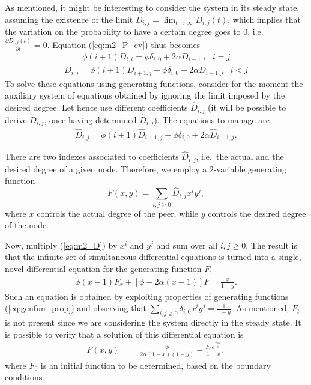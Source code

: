 \documentclass[a4paper,twosided]{article}
\begin{document}
As mentioned, it might be interesting to consider the system in its steady state, assuming the existence of the limit $D_{i,j} = \lim_{t \rightarrow \infty} D_{i,j}(t)$, which implies that the variation on the probability to have a certain degree goes to $0$, i.e.~$\frac{\partial D_{i,j}(t)}{\partial t}=0$. 
Equation (\ref{eq:m2_P_ev}) thus becomes
\begin{eqnarray}
    \phi (i+1) D_{i,i} = \phi\delta_{i,0} + 2\alpha D_{i-1,i} & i=j
\label{eq:m2_boundary}
\end{eqnarray}
\begin{eqnarray}
    [\phi (i+1) + 2\alpha ] D_{i,j} = \phi (i+1) D_{i+1,j} 
+ \phi\delta_{i,0} + 2\alpha D_{i-1,j} & i<j
\label{eq:m2_P_ev_steady}
\end{eqnarray}
To solve these equations using generating functions, consider for the moment the auxiliary system of equations obtained by ignoring the limit imposed by the desired degree. Let hence use different coefficients $\hat{D}_{i,j}$ (it will be possible to derive $D_{i,j}$, once having determined $\hat{D}_{i,j}$). The equations to manage are
\begin{eqnarray}
    [\phi (i+1) + 2\alpha ] \hat{D}_{i,j} = \phi (i+1) \hat{D}_{i+1,j} 
+ \phi\delta_{i,0} + 2\alpha \hat{D}_{i-1,j}.
\label{eq:m2_D}
\end{eqnarray}

There are two indexes associated to coefficients $\hat{D}_{i,j}$, i.e.~the actual and the desired degree of a given node. Therefore, we employ a $2$-variable generating function 
$$F(x,y) = \sum_{i,j\geq 0} \hat{D}_{i,j} x^i y^j,$$ 
where $x$ controls the actual degree of the peer, while $y$ controls the desired degree of the node. 

Now, multiply (\ref{eq:m2_D}) by $x^i$ and $y^j$ and sum over all $i,j\geq0$. The result is that the infinite set of simultaneous differential equations is turned into a single, novel differential equation for the generating function $F$,
\begin{eqnarray}
\phi (x-1) F_x + [\phi - 2\alpha(x-1) ] F = \frac{\phi}{1-y}.
\label{eq:m2_pde}
\end{eqnarray}
Such an equation is obtained by exploiting properties of generating functions (\ref{eq:genfun_prop}) and observing that $\sum_{i, j\geq 0} \delta_{i,0}x^i y^j = \frac{1}{1-y}.$
As mentioned, $F_t$ is not present since we are considering the system directly in the steady state. It is possible to verify that a solution of this differential equation is
\begin{eqnarray}
F(x,y) & = & {\textstyle\frac{\textstyle \phi }{\textstyle 2\alpha (1-x)(1-y)}} - \frac{F_0 e^{\frac{2\alpha x}{\phi}}}{1-x},
\label{eq:F}
\end{eqnarray}
where $F_0$ is an initial function to be determined, based on the boundary conditions.
\end{document}
